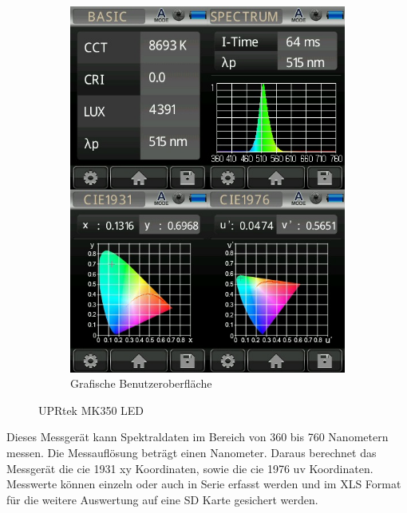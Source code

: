 \documentclass[11pt]{scrartcl}
\begin{document}
\begin{figure}[H]
\begin{subfigure}[b]{0.49\textwidth}
        \includegraphics[width=\textwidth]{images/mk350_lightcan_green.JPG}
        \caption{Grafische Benutzeroberfläche}
    \end{subfigure}
    \caption{UPRtek MK350 LED}
\end{figure}
\noindent
Dieses Messgerät kann Spektraldaten im Bereich von 360 bis 760 Nanometern messen. Die Messauflösung beträgt einen Nanometer. Daraus berechnet
das Messgerät die \ac{cie} 1931 xy Koordinaten, sowie die \ac{cie} 1976 uv Koordinaten. Messwerte können einzeln oder auch in Serie erfasst werden und
im XLS Format für die weitere Auswertung auf eine SD Karte gesichert werden.
\clearpage

\end{document}
